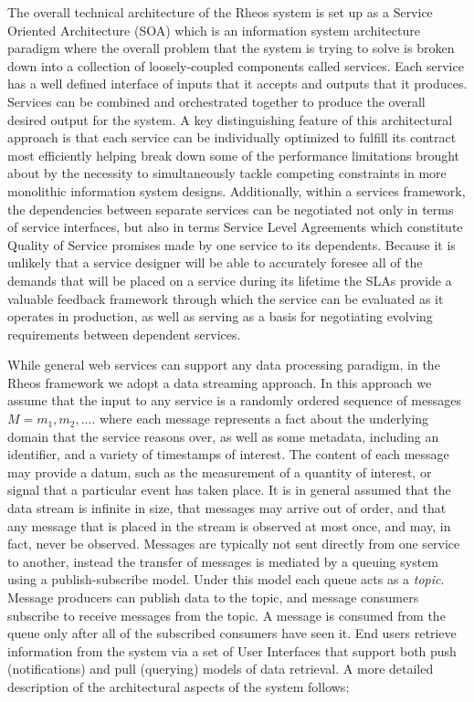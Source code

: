 The overall technical architecture of the Rheos system is set up as a Service Oriented Architecture (SOA)\autocite{shaw1996software} which is an information system architecture paradigm where the overall problem that the system is trying to solve is broken down into a collection of loosely-coupled components called services. Each service has a well defined interface of inputs that it accepts and outputs that it produces. Services can be combined and orchestrated together to produce the overall desired output for the system. A key distinguishing feature of this architectural approach is that each service can be individually optimized to fulfill its contract most efficiently helping break down some of the performance limitations brought about by the necessity to simultaneously tackle competing constraints in more monolithic information system designs. Additionally, within a services framework, the dependencies between separate services can be negotiated not only in terms of service interfaces, but also in terms Service Level Agreements which constitute Quality of Service promises made by one service to its dependents\autocite{ingham2000constructing}. Because it is unlikely that a service designer will be able to accurately foresee all of the demands that will be placed on a service during its lifetime the SLAs provide a valuable feedback framework through which the service can be evaluated as it operates in production, as well as serving as a basis for negotiating evolving requirements between dependent services.

While general web services can support any data processing paradigm, in the Rheos framework we adopt a data streaming approach\autocite{babcock2002models}. In this approach we assume that the input to any service is a randomly ordered sequence of messages $M = {m_1, m_2, ....}$ where each message represents a fact about the underlying domain that the service reasons over, as well as some metadata, including an identifier, and a variety of timestamps of interest. The content of each message may provide a datum, such as the measurement of a quantity of interest, or signal that a particular event has taken place. It is in general assumed that the data stream is infinite in size, that messages may arrive out of order, and that any message that is placed in the stream is observed at most once, and may, in fact, never be observed. Messages are typically not sent directly from one service to another, instead the transfer of messages is mediated by a queuing system using a publish-subscribe\autocite{eugster2003many} model. Under this model each queue acts as a \emph{topic}. Message producers can publish data to the topic, and message consumers subscribe to receive messages from the topic. A message is consumed from the queue only after all of the subscribed consumers have seen it. End users retrieve information from the system via a set of User Interfaces that support both push (notifications) and pull (querying) models of data retrieval. A more detailed description of the architectural aspects of the system follows:

